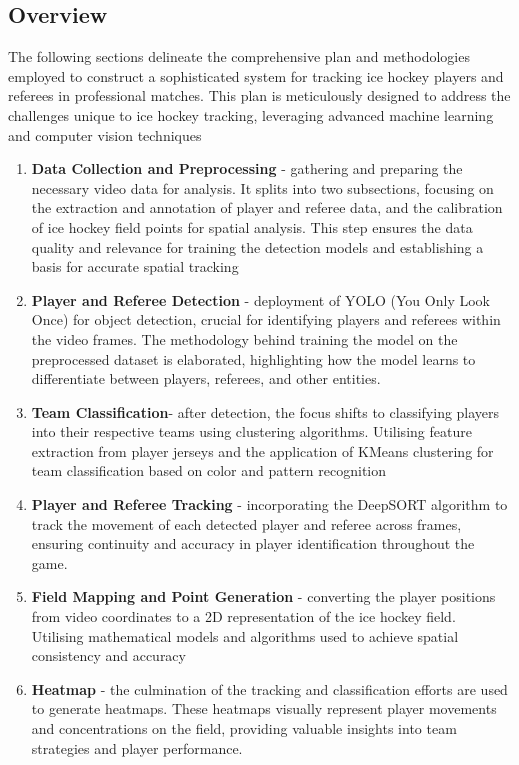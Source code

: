 \documentclass[12pt, letterpaper]{article}
\begin{document}
{
\setlength{\parskip}{0.3cm}
\subsection{Overview}
\begin{spacing}{1.2}

The following sections delineate the comprehensive plan and methodologies employed to construct a sophisticated system for tracking ice hockey players and referees in professional matches. This plan is meticulously designed to address the challenges unique to ice hockey tracking, leveraging advanced machine learning and computer vision techniques

\begin{enumerate}
    \item \textbf{Data Collection and Preprocessing} - gathering and preparing the necessary video data for analysis. It splits into two subsections, focusing on the extraction and annotation of player and referee data, and the calibration of ice hockey field points for spatial analysis. This step ensures the data quality and relevance for training the detection models and establishing a basis for accurate spatial tracking
    \item \textbf{Player and Referee Detection} - deployment of YOLO (You Only Look Once) for object detection, crucial for identifying players and referees within the video frames. The methodology behind training the model on the preprocessed dataset is elaborated, highlighting how the model learns to differentiate between players, referees, and other entities.
    \item \textbf{Team Classification}- after detection, the focus shifts to classifying players into their respective teams using clustering algorithms. Utilising feature extraction from player jerseys and the application of KMeans clustering for team classification based on color and pattern recognition
    \item \textbf{Player and Referee Tracking }- incorporating the DeepSORT algorithm to track the movement of each detected player and referee across frames, ensuring continuity and accuracy in player identification throughout the game.
    \item \textbf{Field Mapping and Point Generation} - converting the player positions from video coordinates to a 2D representation of the ice hockey field. Utilising mathematical models and algorithms used to achieve spatial consistency and accuracy
    \item \textbf{Heatmap} - the culmination of the tracking and classification efforts are used to generate heatmaps. These heatmaps visually represent player movements and concentrations on the field, providing valuable insights into team strategies and player performance.
    
\end{enumerate}

\end{spacing}
}
\end{document}
